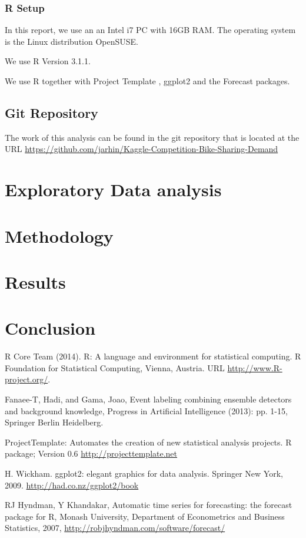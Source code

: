 \documentclass{article}
\begin{document}
\subsubsection{R Setup}

In this report, we use an an Intel i7 PC with 16GB RAM. The operating system is the Linux distribution OpenSUSE. 

We use R \cite{RProj} Version 3.1.1.

We use R together with Project Template \cite{ProjectTemplate2014}, ggplot2 \cite{hwggplot} and the Forecast \cite{forcastpackage} packages.
\subsection{Git Repository}

The work of this analysis can be found in the git repository that is located at the URL \url{https://github.com/jarhin/Kaggle-Competition-Bike-Sharing-Demand}

\section{Exploratory Data analysis}
\section{Methodology}
\section{Results}
\section{Conclusion}


\begin{thebibliography}{9}
	R Core Team (2014). R: A language and environment for statistical computing. R Foundation for Statistical Computing, Vienna, Austria.
        URL \url{http://www.R-project.org/}.


	  Fanaee-T, Hadi, and Gama, Joao, Event labeling combining ensemble detectors and background knowledge, Progress in Artificial Intelligence (2013): pp. 1-15, Springer Berlin Heidelberg.
	  
	  ProjectTemplate: Automates the creation of new statistical analysis projects. R package; Version 0.6 \url{http://projecttemplate.net}
	  
	  H. Wickham. ggplot2: elegant graphics for data analysis. Springer New York, 2009. \url{http://had.co.nz/ggplot2/book}
	  
	  RJ Hyndman, Y Khandakar, Automatic time series for forecasting: the forecast package for R, Monash University, Department of Econometrics and Business Statistics, 2007, \url{http://robjhyndman.com/software/forecast/}

\end{thebibliography}
\end{document}
